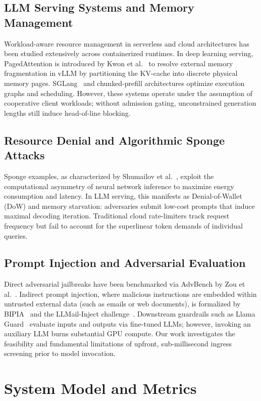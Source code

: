 \documentclass[runningheads]{article}
\begin{document}
\subsection{LLM Serving Systems and Memory Management}
Workload-aware resource management in serverless and cloud architectures has been studied extensively across containerized runtimes. In deep learning serving, PagedAttention is introduced by Kwon et al.~\cite{kwon2023vllm} to resolve external memory fragmentation in vLLM by partitioning the KV-cache into discrete physical memory pages. SGLang~\cite{zheng2024sglang} and chunked-prefill architectures optimize execution graphs and scheduling. However, these systems operate under the assumption of cooperative client workloads; without admission gating, unconstrained generation lengths still induce head-of-line blocking.

\subsection{Resource Denial and Algorithmic Sponge Attacks}
Sponge examples, as characterized by Shumailov et al.~\cite{shumailov2021sponge}, exploit the computational asymmetry of neural network inference to maximize energy consumption and latency. In LLM serving, this manifests as Denial-of-Wallet (DoW) and memory starvation: adversaries submit low-cost prompts that induce maximal decoding iteration. Traditional cloud rate-limiters track request frequency but fail to account for the superlinear token demands of individual queries.

\subsection{Prompt Injection and Adversarial Evaluation}
Direct adversarial jailbreaks have been benchmarked via AdvBench by Zou et al.~\cite{zou2023universal}. Indirect prompt injection, where malicious instructions are embedded within untrusted external data (such as emails or web documents), is formalized by BIPIA~\cite{bipia2023} and the LLMail-Inject challenge~\cite{abdelnabi2025llmail}. Downstream guardrails such as Llama Guard~\cite{inan2023llama} evaluate inputs and outputs via fine-tuned LLMs; however, invoking an auxiliary LLM burns substantial GPU compute. Our work investigates the feasibility and fundamental limitations of upfront, sub-millisecond ingress screening prior to model invocation.

\section{System Model and Metrics}
\end{document}
